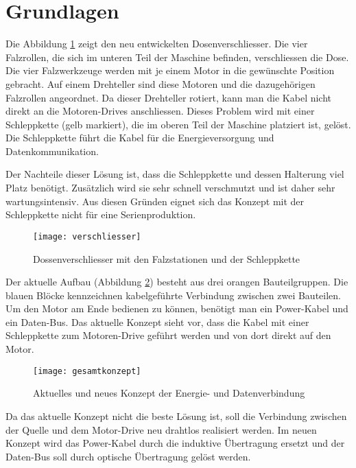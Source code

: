 \section{Grundlagen}\label{sec:Grundlagen}

Die Abbildung \ref{fig:verschliesser} zeigt den neu entwickelten Dosenverschliesser. Die vier Falzrollen, die sich im unteren Teil der Maschine befinden, verschliessen die Dose. Die vier Falzwerkzeuge werden mit je einem Motor in die gewünschte Position gebracht. Auf einem Drehteller sind diese Motoren und die dazugehörigen Falzrollen angeordnet. Da dieser Drehteller rotiert, kann man die Kabel nicht direkt an die Motoren-Drives anschliessen. Dieses Problem wird mit einer Schleppkette (gelb markiert), die im oberen Teil der Maschine platziert ist, gelöst. Die Schleppkette führt die Kabel für die Energieversorgung und Datenkommunikation.

Der Nachteile dieser Lösung ist, dass die Schleppkette und dessen Halterung viel Platz benötigt. Zusätzlich wird sie sehr schnell verschmutzt und ist daher sehr wartungsintensiv. Aus diesen Gründen eignet sich das Konzept mit der Schleppkette nicht für eine Serienproduktion.  

\begin{figure}[H]
	\centering
	\texttt{[image: verschliesser]}
	\caption{Dossenverschliesser mit den Falzstationen und der Schleppkette}\label{fig:verschliesser}
\end{figure}

Der aktuelle Aufbau (Abbildung \ref{fig:gesamtkonzept}) besteht aus drei orangen Bauteilgruppen. Die blauen Blöcke kennzeichnen kabelgeführte Verbindung zwischen zwei Bauteilen. Um den Motor am Ende bedienen zu können, benötigt man ein Power-Kabel und ein Daten-Bus. Das aktuelle Konzept sieht vor, dass die Kabel mit einer Schleppkette zum Motoren-Drive geführt werden und von dort direkt auf den Motor. 

\begin{figure}[H]
	\centering
	\texttt{[image: gesamtkonzept]}
	\caption{Aktuelles und neues Konzept der Energie- und Datenverbindung}\label{fig:gesamtkonzept}
\end{figure}

Da das aktuelle Konzept nicht die beste Lösung ist, soll die Verbindung zwischen der Quelle und dem Motor-Drive neu drahtlos realisiert werden. Im neuen Konzept wird das Power-Kabel durch die induktive Übertragung ersetzt und der Daten-Bus soll durch optische Übertragung gelöst werden. 

